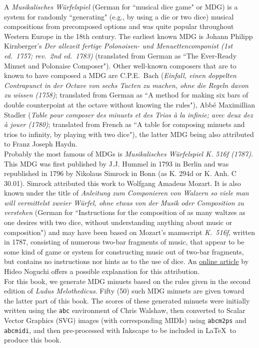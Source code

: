 \documentclass[a4paper,x11names,svgnames,10pt]{article}
\begin{document}
{\noindent A {\it Musikalisches W\"{u}rfelspiel} (German for ``musical dice game" or MDG) is a system for randomly ``generating" (e.g., by using a die or two dice) musical compositions from precomposed options and was quite popular throughout Western Europe in the 18th century.  The earliest known MDG is Johann Philipp Kirnberger's {\em Der allezeit fertige Polonoisen- und Menuettencomponist (1st ed.\ 1757; rev.\ 2nd ed.\ 1783)} (translated from German as ``The Ever-Ready Minuet and Polonaise Composer").  Other well-known composers that are to known to have composed a MDG are C.P.E.\ Bach ({\em Einfall, einen doppelten Contrapunct in der Octave von sechs Tacten zu machen, ohne die Regeln davon zu wissen (1758)}; translated from German as ``A method for making six bars of double counterpoint at the octave without knowing the rules"), Abb\'{e} Maximillian Stadler ({\em Table pour composer des minuets et des Trios \`{a} la infinie; avec deux dez \`{a} jouer (1780)}; translated from French as ``A table for composing minuets and trios to infinity, by playing with two dice"), the latter MDG being also attributed to Franz Joseph Haydn.\\

Probably the most famous of MDGs is {\it Musikalisches W\"{u}rfelspiel K. 516f (1787)}.  This MDG was first published by J.J. Hummel in 1793 in Berlin and was republished in 1796 by Nikolaus Simrock in Bonn (as K. 294d or K. Anh. C 30.01). Simrock attributed this work to Wolfgang Amadeus Mozart. It is also known under the title of {\em Anleitung zum Componieren von Walzern so viele man will vermittelst zweier W\"{u}rfel, ohne etwas von der Musik oder Composition zu verstehen} (German for ``Instructions for the composition of as many waltzes as one desires with two dice, without understanding anything about music or composition") and may have been based on Mozart's manuscript {\em K.\ 516f}, written in 1787, consisting of numerous two-bar fragments of music, that appear to be some kind of game or system for constructing music out of two-bar fragments, but contains no instructions nor hints as to the use of dice.  An \href{(http://www.asahi-net.or.jp/\~rb5h-ngc/e/k516f.htm}{online article} by Hideo Noguchi offers a possible explanation for this attribution.\\

For this book, we generate MDG minuets based on the rules given in the second edition of {\it Ludus Melothedicus}.  Fifty (50) such MDG minuets are given toward the latter part of this book. The scores of these generated minuets were initially written using the \texttt{abc} environment of Chris Walshaw, then converted to Scalar Vector Graphics (SVG) images (with corresponding MIDIs) using {\tt abcm2ps} and {\tt abcmidi}, and then pre-processed with Inkscape to be included in \LaTeX\ to produce this book.


}
\end{document}
